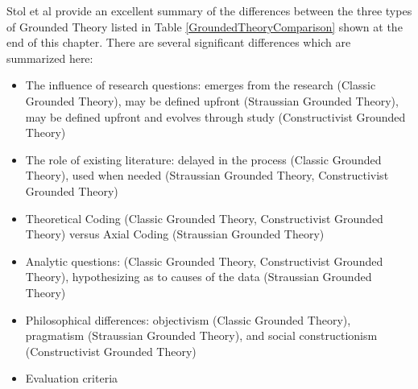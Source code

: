 Stol et al \cite{StolGroundedTheory} provide an excellent summary of the differences between the three types of Grounded Theory listed in Table \ref{GroundedTheoryComparison} shown at the end of this chapter. There are several significant differences which are summarized here:
\begin{itemize}
\item The influence of research questions: emerges from the research (Classic Grounded Theory), may be defined upfront (Straussian Grounded Theory), may be defined upfront and evolves through study (Constructivist Grounded Theory)
\item The role of existing literature: delayed in the process (Classic Grounded Theory), used when needed (Straussian Grounded Theory, Constructivist Grounded Theory)
\item Theoretical Coding (Classic Grounded Theory, Constructivist Grounded Theory) versus Axial Coding (Straussian Grounded Theory)
\item Analytic questions:  (Classic Grounded Theory, Constructivist Grounded Theory), hypothesizing as to causes of the data (Straussian Grounded Theory)
\item Philosophical differences: objectivism (Classic Grounded Theory), pragmatism (Straussian Grounded Theory), and social constructionism (Constructivist Grounded Theory)
\item Evaluation criteria
\end{itemize}


